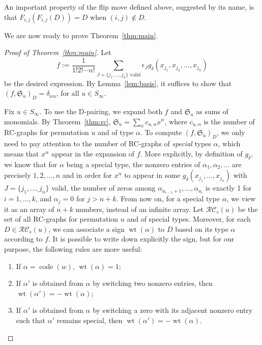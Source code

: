 \documentclass[10pt]{amsart}
\newcommand{\RC}{\mathcal{RC}}
\DeclareMathOperator{\wt}{wt}
\DeclareMathOperator{\code}{code}
\begin{document}
An important property of the flip move defined above, suggested by its name, is that $F_{i,j}(F_{i,j}(D))=D$ when $(i,j)\notin D$. 

We are now ready to prove Theorem~\ref{thm:main}.
\begin{proof}[Proof of Theorem~\ref{thm:main}]
Let 
\[
f:=\frac{1}{1!2!\cdots n!}\sum_{J=\{j_1,\ldots,j_n\}\text{ valid}}\epsilon_J g_{\delta}(x_{j_1},x_{j_2},\ldots,x_{j_n})
\]
be the desired expression. By Lemma~\ref{lem:basis}, it suffices to show that $(f,\mathfrak{S}_u)_D=\delta_{wu}$, for all $u\in S_{\infty}$.

Fix $u\in S_{\infty}$. To use the D-pairing, we expand both $f$ and $\mathfrak{S}_u$ as sums of monomials. By Theorem~\ref{thm:rc}, $\mathfrak{S}_u=\sum_{\alpha} c_{u,\alpha}x^{\alpha}$, where $c_{u,\alpha}$ is the number of RC-graphs for permutation $u$ and of type $\alpha$. To compute $(f,\mathfrak{S}_u)_D$, we only need to pay attention to the number of RC-graphs of \emph{special} types $\alpha$, which means that $x^{\alpha}$ appear in the expansion of $f$. More explicitly, by definition of $g_{\delta}$, we know that for $\alpha$ being a special type, the nonzero entries of $\alpha_1,\alpha_2,\ldots$ are precisely $1,2,\ldots,n$ and in order for $x^{\alpha}$ to appear in some $g_{\delta}(x_{j_1},\ldots,x_{j_n})$ with $J=\{j_1,\ldots,j_n\}$ valid, the number of zeros among $\alpha_{a_{i-1}+1},\ldots,\alpha_{a_i}$ is exactly 1 for $i=1,\ldots,k$, and $\alpha_j=0$ for $j>n+k$. From now on, for a special type $\alpha$, we view it as an array of $n+k$ numbers, instead of an infinite array. Let $\RC_s(u)$ be the set of all RC-graphs for permutation $u$ and of special types. Moreover, for each $D\in\RC_s(u)$, we can associate a sign $\wt(\alpha)$ to $D$ based on its type $\alpha$ according to $f$. It is possible to write down explicitly the sign, but for our purpose, the following rules are more useful:
\begin{enumerate}
\item\label{proof_theo2.2_prem1} If $\alpha=\code(w)$, $\wt(\alpha)=1$;
\item\label{proof_theo2.2_prem2} If $\alpha'$ is obtained from $\alpha$ by switching two nonzero entries, then $\wt(\alpha')=-\wt(\alpha)$;
\item\label{proof_theo2.2_prem3} If $\alpha'$ is obtained from $\alpha$ by switching a zero with its adjacent nonzero entry such that $\alpha'$ remains special, then $\wt(\alpha')=-\wt(\alpha)$.
\end{enumerate}

\end{proof}
\end{document}

